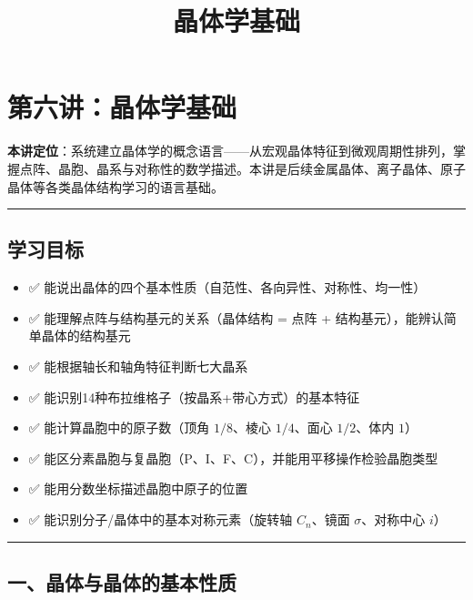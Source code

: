 \documentclass[a4paper,11pt]{ctexart}
\title{晶体学基础}
\date{}
\providecommand{\tightlist}{\setlength{\itemsep}{0pt}\setlength{\parskip}{0pt}}
\begin{document}
\maketitle
\tableofcontents
\newpage
\section{第六讲：晶体学基础}\label{ux7b2cux516dux8bb2ux6676ux4f53ux5b66ux57faux7840}

\textbf{本讲定位}：系统建立晶体学的概念语言------从宏观晶体特征到微观周期性排列，掌握点阵、晶胞、晶系与对称性的数学描述。本讲是后续金属晶体、离子晶体、原子晶体等各类晶体结构学习的语言基础。

\begin{center}\rule{0.5\linewidth}{0.5pt}\end{center}

\subsection{学习目标}\label{ux5b66ux4e60ux76eeux6807}

\begin{itemize}
\tightlist
\item
  ✅ 能说出晶体的四个基本性质（自范性、各向异性、对称性、均一性）
\item
  ✅ 能理解点阵与结构基元的关系（晶体结构 = 点阵 + 结构基元），能辨认简单晶体的结构基元
\item
  ✅ 能根据轴长和轴角特征判断七大晶系
\item
  ✅ 能识别14种布拉维格子（按晶系+带心方式）的基本特征
\item
  ✅ 能计算晶胞中的原子数（顶角 \(1/8\)、棱心 \(1/4\)、面心 \(1/2\)、体内 \(1\)）
\item
  ✅ 能区分素晶胞与复晶胞（P、I、F、C），并能用平移操作检验晶胞类型
\item
  ✅ 能用分数坐标描述晶胞中原子的位置
\item
  ✅ 能识别分子/晶体中的基本对称元素（旋转轴 \(C_n\)、镜面 \(\sigma\)、对称中心 \(i\)）
\end{itemize}

\begin{center}\rule{0.5\linewidth}{0.5pt}\end{center}

\subsection{一、晶体与晶体的基本性质}\label{ux4e00ux6676ux4f53ux4e0eux6676ux4f53ux7684ux57faux672cux6027ux8d28}
\end{document}

